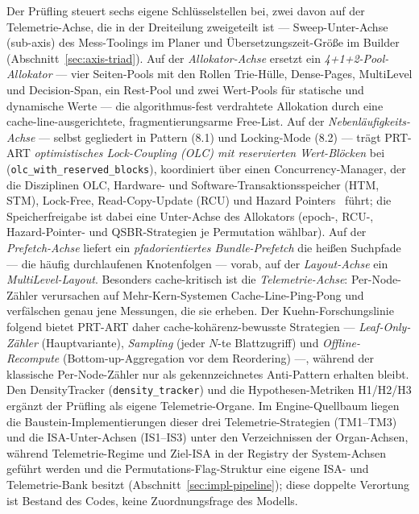 \begin{nurlang}
Der Prüfling steuert sechs eigene Schlüsselstellen bei, zwei davon auf der Telemetrie-Achse, die in der
Dreiteilung zweigeteilt ist --- Sweep-Unter-Achse (sub-axis) des Mess-Toolings im Planer und
Übersetzungszeit-Größe im Builder (Abschnitt~\ref{sec:axis-triad}). Auf der \emph{Allokator-Achse} ersetzt
ein \emph{4+1+2-Pool-Allokator} --- vier Seiten-Pools mit den Rollen Trie-Hülle, Dense-Pages, MultiLevel
und Decision-Span, ein Rest-Pool und zwei Wert-Pools für statische und dynamische Werte --- die
algorithmus-fest verdrahtete Allokation durch eine cache-line-ausgerichtete, fragmentierungsarme Free-List.
Auf der \emph{Nebenläufigkeits-Achse} --- selbst gegliedert in Pattern (8.1) und Locking-Mode (8.2) --- trägt
PRT-ART \emph{optimistisches Lock-Coupling (OLC) mit reservierten Wert-Blöcken} bei
(\texttt{olc\_\allowbreak{}with\_\allowbreak{}reserved\_\allowbreak{}blocks}), koordiniert über einen
Concurrency-Manager, der die Disziplinen OLC, Hardware- und Software-Transaktionsspeicher (HTM, STM),
Lock-Free, Read-Copy-Update (RCU) und Hazard Pointers~\cite{michael2004hazard} führt; die Speicherfreigabe
ist dabei eine Unter-Achse des Allokators (epoch-, RCU-, Hazard-Pointer- und QSBR-Strategien je
Permutation wählbar). Auf der \emph{Prefetch-Achse} liefert ein \emph{pfadorientiertes Bundle-Prefetch}
die heißen Suchpfade --- die häufig durchlaufenen Knotenfolgen --- vorab, auf der \emph{Layout-Achse}
ein \emph{MultiLevel-Layout}. Besonders
cache-kritisch ist die \emph{Telemetrie-Achse}: Per-Node-Zähler verursachen auf Mehr-Kern-Systemen
Cache-Line-Ping-Pong und verfälschen genau jene Messungen, die sie erheben. Der
Kuehn-Forschungslinie~\cite{kuehn2023bplustree} folgend bietet PRT-ART daher cache-kohärenz-bewusste
Strategien --- \emph{Leaf-Only-Zähler} (Hauptvariante), \emph{Sampling} (jeder $N$-te Blattzugriff) und
\emph{Offline-Recompute} (Bottom-up-Aggregation vor dem Reordering) ---, während der klassische
Per-Node-Zähler nur als gekennzeichnetes Anti-Pattern erhalten bleibt. Den DensityTracker
(\texttt{density\_\allowbreak{}tracker}) und die Hypothesen-Metriken H1/H2/H3 ergänzt der Prüfling als
eigene Telemetrie-Organe.
Im Engine-Quellbaum liegen die Baustein-Implementierungen dieser drei Telemetrie-Strategien (TM1--TM3) und
die ISA-Unter-Achsen (IS1--IS3) unter den Verzeichnissen der Organ-Achsen, während Telemetrie-Regime und
Ziel-ISA in der Registry der System-Achsen geführt werden und die Permutations-Flag-Struktur eine eigene
ISA- und Telemetrie-Bank besitzt (Abschnitt~\ref{sec:impl-pipeline}); diese doppelte Verortung ist Bestand des
Codes, keine Zuordnungsfrage des Modells.


\end{nurlang}

